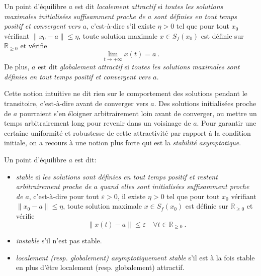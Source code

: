 \hypertarget{def_attract}{}
\begin{definition}[Attractivité]\label{def_attract}
Un point d'équilibre \(a\) est dit \emph{localement attractif} si
\emph{toutes les solutions maximales initialisées suffisamment proche de
\(a\) sont définies en tout temps positif et convergent vers \(a\)},
c'est-à-dire s'il existe \(\eta>0\) tel que pour tout \(x_0\) vérifiant
\(\|x_0-a\|\leq \eta\), toute solution maximale \(x \in S_f(x_0)\) est
définie sur \(\mathbb{R}_{\geq 0}\) et vérifie \[
\lim_{t\to+\infty} x(t)=a \ .
\] De plus, \(a\) est dit \emph{globalement attractif} si \emph{toutes
les solutions maximales sont définies en tout temps positif et
convergent vers \(a\)}.
\end{definition}

Cette notion intuitive ne dit rien sur le comportement des solutions
pendant le transitoire, c'est-à-dire avant de converger vers \(a\). Des
solutions initialisées proche de \(a\) pourraient s'en éloigner
arbitrairement loin avant de converger, ou mettre un temps
arbitrairement long pour revenir dans un voisinage de \(a\). Pour
garantir une certaine uniformité et robustesse de cette attractivité par
rapport à la condition initiale, on a recours à une notion plus forte
qui est la \emph{stabilité asymptotique}.

\hypertarget{def_stab}{}
\begin{definition}\label{def_stab}
Un point d'équilibre \(a\) est dit:

\begin{itemize}
\item
  \emph{stable} si \emph{les solutions sont définies en tout temps
  positif et restent arbitrairement proche de \(a\) quand elles sont
  initialisées suffisamment proche de \(a\)}, c'est-à-dire pour tout
  \(\varepsilon >0\), il existe \(\eta>0\) tel que pour tout \(x_0\)
  vérifiant \(\|x_0-a\|\leq \eta\), toute solution maximale
  \(x \in S_f(x_0)\) est définie sur \(\mathbb{R}_{\geq 0}\) et vérifie
  \[
  \|x(t)-a\|\leq \varepsilon \quad \forall t\in \mathbb{R}_{\geq 0}\ .
  \]
\item
  \emph{instable} s'il n'est pas stable.
\item
  \emph{localement (resp. globalement) asymptotiquement stable} s'il est
  à la fois stable en plus d'être localement (resp. globalement)
  attractif.
\end{itemize}
\end{definition}


